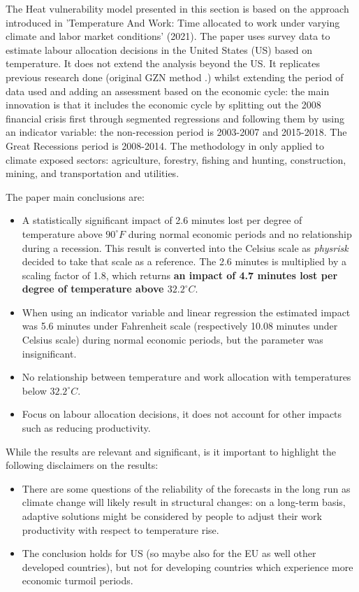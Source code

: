 \documentclass[a4paper,11pt]{extarticle} %
\begin{document}
The Heat vulnerability model presented in this section is based on the approach introduced in 'Temperature And Work: Time allocated to work under varying climate and labor market conditions' (2021)\cite{TemperatureAndWork:2021}. The paper uses survey data to estimate labour allocation decisions in the United States (US) based on temperature. It does not extend the analysis beyond the US. It replicates previous research done (original GZN method \cite{TemperatureAndTheAllocationofTime:2014}.) whilst extending the period of data used and adding an assessment based on the economic cycle: the main innovation is that it includes the economic cycle by splitting out the 2008 financial crisis first through segmented regressions and following them by using an indicator variable: the non-recession period is 2003-2007 and 2015-2018. The Great Recessions period is 2008-2014. The methodology in only applied to climate exposed sectors: agriculture, forestry, fishing and hunting, construction, mining, and transportation and utilities.


The paper main conclusions are:
\begin{itemize}
    \item A statistically significant impact of 2.6 minutes lost per degree of temperature above $90^\circ F$ during normal economic periods and no relationship during a recession. This result is converted into the Celsius scale as \emph{physrisk} decided to take that scale as a reference. The 2.6 minutes is multiplied by a scaling factor of 1.8, which returns \textbf{an impact of 4.7 minutes lost per degree of temperature above $32.2^\circ C$}. 
    \item When using an indicator variable and linear regression the estimated impact was 5.6 minutes under Fahrenheit scale (respectively 10.08 minutes under Celsius scale) during normal economic periods, but the parameter was insignificant. 
    \item No relationship between temperature and work allocation with temperatures below  $32.2^\circ C$. 
    \item Focus on labour allocation decisions, it does not account for other impacts such as reducing productivity. 
\end{itemize}

While the results are relevant and significant, is it important to highlight the following disclaimers on the results:
\begin{itemize}
    \item There are some questions of the reliability of the forecasts in the long run as climate change will likely result in structural changes: on a long-term basis, adaptive solutions might be considered by people to adjust their work productivity with respect to temperature rise.
    \item The conclusion holds for US (so maybe also for the EU as well other developed countries), but not for developing countries which experience more economic turmoil periods.
\end{itemize}
\end{document}
